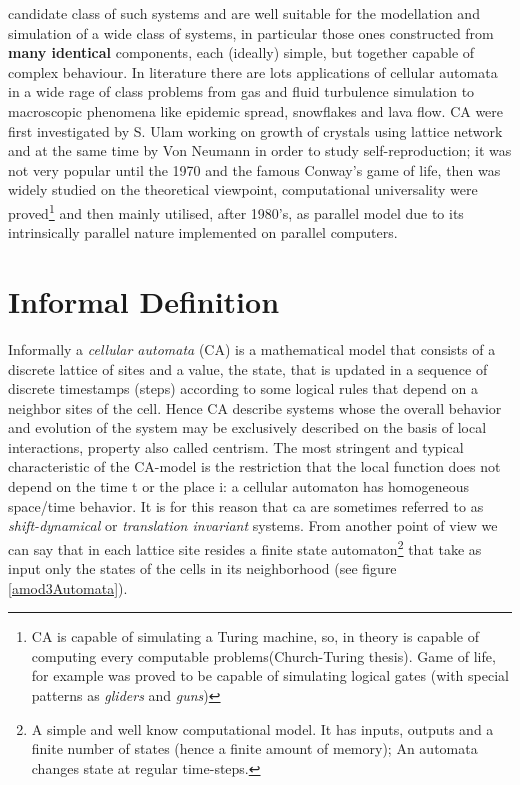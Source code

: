 candidate class of such systems and are well suitable for the modellation and
simulation of a wide class of systems, in particular those ones constructed from
\textbf{many identical} components, each (ideally) simple, but together capable
of complex behaviour\cite{Toffoli1984}\cite{toffoli1987}. In literature there
are lots applications of cellular automata in a wide rage of class problems from
gas\cite{Frisch1986} and fluid turbulence\cite{Succi1991} simulation to
macroscopic phenomena\cite{Gregorio1999} like epidemic
spread\cite{Sirakoulis2000}, snowflakes and lava
flow\cite{Crisci2004}\cite{Spataro2010}.
CA were first investigated by S. Ulam working on growth of crystals using
lattice network and at the same time by Von Neumann in order to study
self-reproduction\cite{Neumann1966}; it was not very popular until the 1970 and
the famous Conway's game of life\cite{conway1970}, then was widely studied on
the theoretical viewpoint, computational universality were
proved\footnote{CA is capable of simulating a Turing machine, so, in theory is
capable of computing every computable problems(Church-Turing
thesis). Game of life, for example was proved to be capable
of simulating logical gates (with special patterns as
\textit{gliders} and \textit{guns})}\cite{Thatcher1970} and then mainly
utilised, after 1980's, as parallel model due to its intrinsically parallel nature implemented on parallel computers\cite{Margolus1986}.




\section{Informal Definition}

Informally a \emph{cellular automata} (CA) is a mathematical model that
consists of a discrete lattice of sites  and a value, the state, that is
updated in a sequence of discrete timestamps (steps) according to some logical rules that
depend on a neighbor  sites of the cell. Hence CA describe systems whose the
overall behavior and evolution of the system may be exclusively described on the basis of local
interactions\cite{wolfram1984}, property also called centrism.
The most stringent and typical characteristic of the CA-model is the restriction
that the local function does not depend on the time t or the place i: a cellular automaton has homogeneous
space/time behavior. It is for this reason that ca are sometimes referred to as
\textit{shift-dynamical} or \textit{translation invariant} systems. From another
point of view we can say that in each lattice site resides a finite state
automaton\footnote{A simple and well know computational model. It has inputs,
outputs and a finite number of states (hence a finite amount of memory);
An automata changes state at regular time-steps.}  that take as
input only the states of the cells in its neighborhood (see figure \ref{amod3Automata}).

